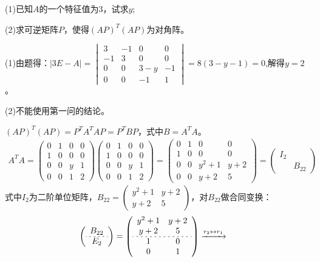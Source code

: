 \documentclass[a4paper]{report}
\begin{document}
(1)已知$A$的一个特征值为$3$，试求$y$;

(2)求可逆矩阵$P$，使得$(AP)^T(AP)$为对角阵。

\begin{jie}
(1)由题得：$|3E-A|=
\begin{vmatrix}
3&-1&0&0\\
-1&3&0&0\\
0&0&3-y&-1\\
0&0&-1&1
\end{vmatrix}=8(3-y-1)=0
$,解得$y=2$。

(2)不能使用第一问的结论。

$(AP)^T(AP)=P^TA^TAP=P^TBP$，式中$B=A^TA$。
\begin{align*}
A^TA=\begin{pmatrix}
0&1&0&0\\
1&0&0&0\\
0&0&y&1\\
0&0&1&2
\end{pmatrix}\begin{pmatrix}
0&1&0&0\\
1&0&0&0\\
0&0&y&1\\
0&0&1&2
\end{pmatrix}=\begin{pmatrix}
0&1&0&0\\
1&0&0&0\\
0&0&y^2+1&y+2\\
0&0&y+2&5
\end{pmatrix}=
\begin{pmatrix}
I_2\\&B_{22}
\end{pmatrix}
\end{align*}
式中$I_2$为二阶单位矩阵，$B_{22}=
\begin{pmatrix}
y^2+1&y+2\\
y+2&5
\end{pmatrix}
$，对$B_{22}$做合同变换：
\begin{align*}
&\left( \begin{array}{c}
B_{22}\\
\hdashline[2pt/3pt]
E_2
\end{array}
\right)=
\left(
 \begin{array}{ccc}
y^2+1&y+2\\
y+2&5\\
\hdashline[2pt/3pt]
1 &0 \\
0 &1
\end{array}
\right)
\xrightarrow{\substack{ r_2\leftrightarrow r_1}}{
}
\end{align*}
\end{jie}
\end{document}
